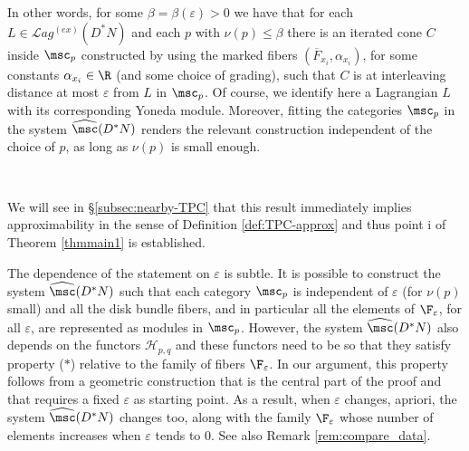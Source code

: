 In other words, for some $\beta = \beta(\varepsilon) >0$ we have that for each $L\in\mathcal{L}ag^{(ex)}(D^{\ast}N)$ and each $p$ with 
$\nu(p)\leq \beta$ there is an iterated cone $C$ inside $\msc_{p}$ constructed by using  the marked fibers $(\overline{F}_{x_{i}},  \alpha_{x_{i}})$, for some constants $\alpha_{x_{i}}\in \R$ (and some choice of grading),  such that $C$ is at interleaving  distance at most $\varepsilon$ from $L$ in $\msc_{p}$.  Of course, we identify here a Lagrangian $L$ with its corresponding Yoneda module. Moreover, fitting the categories $\msc_{p}$ in the system $\widehat{\msc}(D^{\ast}N)$
renders the relevant construction independent of the choice of $p$, as long as $\nu(p)$ is small enough.

\

We will see in \S\ref{subsec:nearby-TPC} that this result immediately implies approximability in the sense of Definition \ref{def:TPC-approx} and thus  point i of Theorem \ref{thmmain1} is established.

\begin{rem}\label{rem:dep_on_e} The dependence of the statement 
on $\varepsilon$ is subtle. It is possible to construct the system $\widehat{\msc}(D^{\ast}N)$ such that each category $\msc_{p}$ is independent of $\varepsilon$ (for $\nu(p)$ small) and  all the disk bundle fibers, and in particular  all the elements of  $\F_{\varepsilon}$, for all $\varepsilon$,  are represented as modules in $\msc_{p}$. However, the system
$\widehat{\msc}(D^{\ast}N)$ also depends on the functors $\mathcal{H}_{p,q}$ and these functors need to be so that they satisfy property ($\ast$) relative to the family of fibers $\F_{\varepsilon}$. In our argument, this property follows from a geometric construction that is the central part of the proof and that requires a fixed $\varepsilon$ as starting point. As a result, when $\varepsilon$ changes, apriori, the system $\widehat{\msc}(D^{\ast}N)$ changes too, along with the family
$\F_{\varepsilon}$ whose number of elements increases when 
$\varepsilon$ tends to $0$.  See also Remark \ref{rem:compare_data}.
\end{rem}

\

